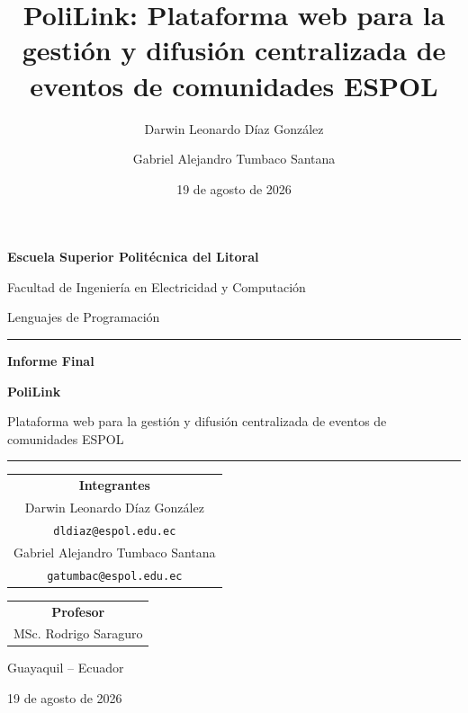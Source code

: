 \documentclass[12pt]{article}
\title{PoliLink: Plataforma web para la gestión y difusión centralizada de eventos de comunidades ESPOL}
\author{Darwin Leonardo Díaz González \and Gabriel Alejandro Tumbaco Santana}
\date{19 de agosto de 2026}
\begin{document}
\begin{titlepage}
    \centering
    \vspace*{1.2cm}
    {\Large\bfseries Escuela Superior Politécnica del Litoral\par}
    \vspace{0.25cm}
    {\large Facultad de Ingeniería en Electricidad y Computación\par}
    \vspace{0.15cm}
    {\large Lenguajes de Programación\par}
    \vspace{1.4cm}
    \rule{0.72\textwidth}{0.8pt}\par
    \vspace{0.55cm}
    {\Large\bfseries Informe Final\par}
    \vspace{0.55cm}
    {\LARGE\bfseries PoliLink\par}
    \vspace{0.45cm}
    \begin{minipage}{0.76\textwidth}
        \centering
        \large Plataforma web para la gestión y difusión centralizada de eventos de comunidades ESPOL
    \end{minipage}\par
    \vspace{0.55cm}
    \rule{0.72\textwidth}{0.8pt}\par
    \vfill
    \begin{tabular}{c}
        \textbf{Integrantes} \\[0.25cm]
        Darwin Leonardo Díaz González \\
        \texttt{dldiaz@espol.edu.ec} \\[0.35cm]
        Gabriel Alejandro Tumbaco Santana \\
        \texttt{gatumbac@espol.edu.ec}
    \end{tabular}\par
    \vspace{1.1cm}
    \begin{tabular}{c}
        \textbf{Profesor} \\[0.2cm]
        MSc. Rodrigo Saraguro
    \end{tabular}\par
    \vfill
    {\large Guayaquil -- Ecuador\par}
    \vspace{0.12cm}
    {\large 19 de agosto de 2026\par}
    \vspace*{0.7cm}
\end{titlepage}
\end{document}
